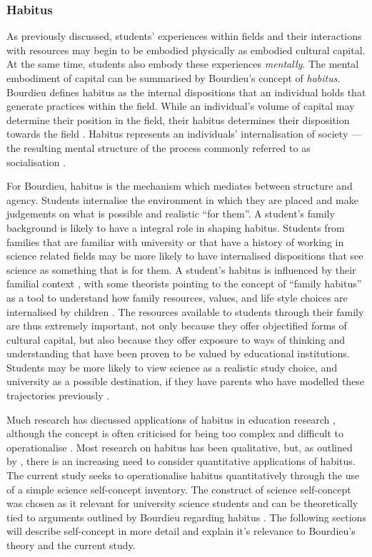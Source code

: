 \subsubsection*{Habitus}
As previously discussed, students' experiences within fields and their interactions with resources may begin to be embodied physically as embodied cultural capital. At the same time, students also embody these experiences \textit{mentally}. The mental embodiment of capital can be summarised by Bourdieu's concept  of \textit{habitus}. Bourdieu defines habitus as the internal dispositions that an individual holds that generate practices within the field. While an individual's volume of capital may determine their position in the field, their habitus determines their disposition towards the field \cite{bourdieu1992invitation}. Habitus represents an individuals' internalisation of society --- the resulting mental structure of the process commonly referred to as socialisation \cite{Nash1999}.

For Bourdieu, habitus is the mechanism which mediates between structure and agency. Students internalise the environment in which they are placed and make judgements on what is possible and realistic ``for them''. A student's family background is likely to have a integral role in shaping habitus. Students from families that are familiar with university or that have a history of working in science related fields may be more likely to have internalised dispositions that see science as something that is for them. A student's habitus is influenced by their familial context \cite{Dimaggio1982}, with some theorists pointing to the concept of ``family habitus'' as a tool to understand how family resources, values, and life style choices are internalised by children \cite{Archer2012,tomanovic2004family}. The resources available to students through their family are thus extremely important, not only because they offer objectified forms of cultural capital, but also because they offer exposure to ways of thinking and understanding that have been proven to be valued by educational institutions. Students may be more likely to view science as a realistic study choice, and university as a possible destination, if they have parents who have modelled these trajectories previously \cite{Lyons_2006}. 

Much research has discussed applications of habitus in education research \cite{Reay_2004,Nash1999}, although the concept is often criticised for being too complex \cite{goldhaber2000does} and difficult to operationalise \cite{dumais2002cultural}. Most research on habitus has been qualitative, but, as outlined by \cite{mu2014heritage}, there is an increasing need to consider quantitative applications of habitus. The current study seeks to operationalise habitus quantitatively through the use of a simple science self-concept inventory. The construct of science self-concept was chosen as it relevant for university science students and can be theoretically tied to arguments outlined by Bourdieu regarding habitus \cite{mu2014heritage,bodovski2014adolescents}. The following sections will describe self-concept in more detail and explain it's relevance to Bourdieu's theory and the current study.   

